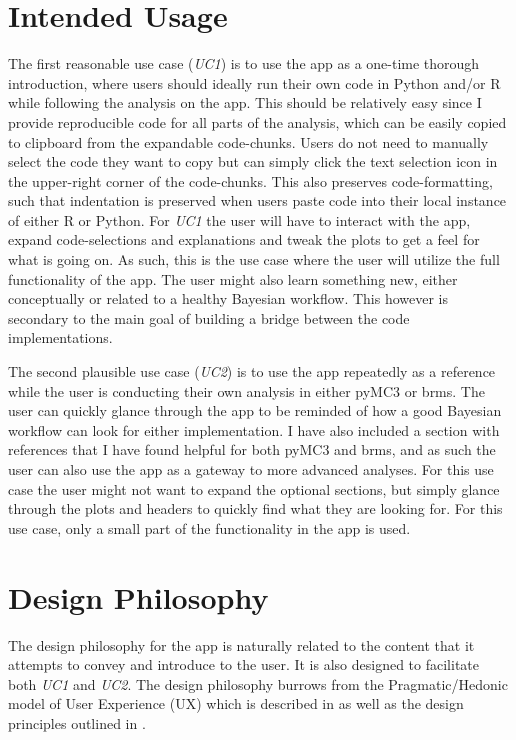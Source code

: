 \documentclass[12pt]{article}
\begin{document}
\section{Intended Usage}
The first reasonable use case (\emph{UC1}) is to use the app as a one-time
thorough introduction, where users should ideally run their own code in Python and/or R
while following the analysis on the app. This should be relatively easy since I provide reproducible code
for all parts of the analysis, which can be easily copied to clipboard from the expandable
code-chunks. Users do not need to manually select the code they want to copy but can simply click
the text selection icon in the upper-right corner of the code-chunks. This also
preserves code-formatting, such that indentation is preserved when users paste
code into their local instance of either R or Python.
For \emph{UC1} the user will have to interact with the app,
expand code-selections and explanations and tweak the plots to get a feel for what is going on.
As such, this is the use case where the user will utilize the full
functionality of the app.
The user might also learn something new, either conceptually or related to a
healthy Bayesian workflow.
This however is secondary to the main goal of building a bridge between the code implementations.

\vspace{5mm}

The second plausible use case (\emph{UC2}) is to use the app repeatedly as a reference
while the user is conducting their own analysis in either pyMC3 or brms. The user can quickly glance through the
app to be reminded of how a good Bayesian workflow can look for either implementation.
I have also included a section with references that I have found helpful for both pyMC3 and brms,
and as such the user can also use the app as a gateway to more advanced analyses.
For this use case the user might not want to expand the optional sections,
but simply glance through the plots and headers to quickly find what they are looking for.
For this use case, only a small part of the functionality in the app is used.

\section{Design Philosophy}
The design philosophy for the app is naturally related to the content that it attempts to convey and
introduce to the user. It is also designed to facilitate both \emph{UC1} and
\emph{UC2}. The design philosophy burrows from the Pragmatic/Hedonic model of
User Experience (UX) which is described in \textcite{hassenzahl2010experience} as well as the design
principles outlined in \textcite{mills1992macintosh}.
\end{document}
